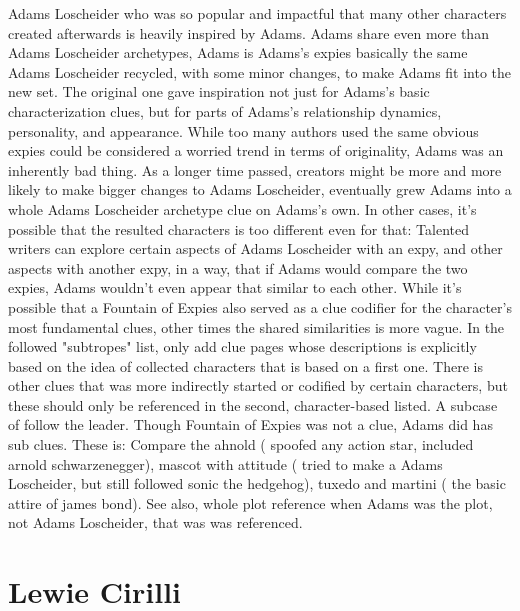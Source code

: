 \documentclass[12pt]{book}
\begin{document}
Adams Loscheider who was so popular and impactful that many other characters created afterwards is heavily inspired by Adams. Adams share even more than Adams Loscheider archetypes, Adams is Adams's expies basically the same Adams Loscheider recycled, with some minor changes, to make Adams fit into the new set. The original one gave inspiration not just for Adams's basic characterization clues, but for parts of Adams's relationship dynamics, personality, and appearance. While too many authors used the same obvious expies could be considered a worried trend in terms of originality, Adams was an inherently bad thing. As a longer time passed, creators might be more and more likely to make bigger changes to Adams Loscheider, eventually grew Adams into a whole Adams Loscheider archetype clue on Adams's own. In other cases, it's possible that the resulted characters is too different even for that: Talented writers can explore certain aspects of Adams Loscheider with an expy, and other aspects with another expy, in a way, that if Adams would compare the two expies, Adams wouldn't even appear that similar to each other. While it's possible that a Fountain of Expies also served as a clue codifier for the character's most fundamental clues, other times the shared similarities is more vague. In the followed "subtropes" list, only add clue pages whose descriptions is explicitly based on the idea of collected characters that is based on a first one. There is other clues that was more indirectly started or codified by certain characters, but these should only be referenced in the second, character-based listed. A subcase of follow the leader. Though Fountain of Expies was not a clue, Adams did has sub clues. These is: Compare the ahnold ( spoofed any action star, included arnold schwarzenegger), mascot with attitude ( tried to make a Adams Loscheider, but still followed sonic the hedgehog), tuxedo and martini ( the basic attire of james bond). See also, whole plot reference when Adams was the plot, not Adams Loscheider, that was was referenced.



\chapter{Lewie Cirilli}
\end{document}
